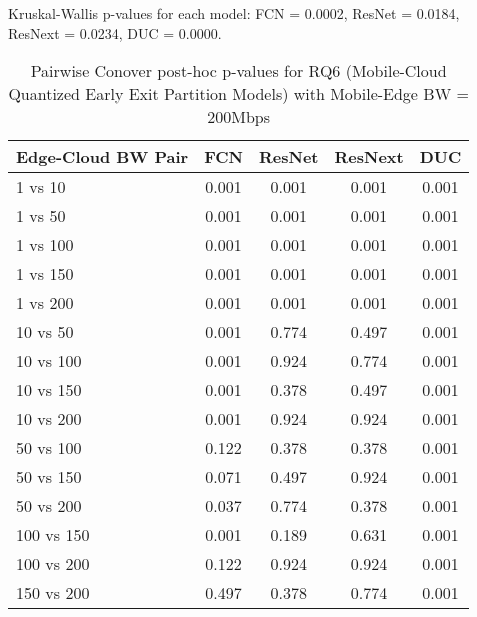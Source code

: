 \begin{table}[h]
\centering
\caption{Pairwise Conover post-hoc p-values for RQ6 (Mobile-Cloud Quantized Early Exit Partition Models) with Mobile-Edge BW = 200Mbps}
\label{tab:conover_mobile_cloud_quantized_earlyexit_partition_me200}
\smallskip
Kruskal-Wallis p-values for each model: FCN = 0.0002, ResNet = 0.0184, ResNext = 0.0234, DUC = 0.0000.

\begin{tabular}{lcccc}
\toprule
Edge-Cloud BW Pair & FCN & ResNet & ResNext & DUC \\
\midrule
1 vs 10 & 0.001 & 0.001 & 0.001 & 0.001 \\
1 vs 50 & 0.001 & 0.001 & 0.001 & 0.001 \\
1 vs 100 & 0.001 & 0.001 & 0.001 & 0.001 \\
1 vs 150 & 0.001 & 0.001 & 0.001 & 0.001 \\
1 vs 200 & 0.001 & 0.001 & 0.001 & 0.001 \\
10 vs 50 & 0.001 & 0.774 & 0.497 & 0.001 \\
10 vs 100 & 0.001 & 0.924 & 0.774 & 0.001 \\
10 vs 150 & 0.001 & 0.378 & 0.497 & 0.001 \\
10 vs 200 & 0.001 & 0.924 & 0.924 & 0.001 \\
50 vs 100 & 0.122 & 0.378 & 0.378 & 0.001 \\
50 vs 150 & 0.071 & 0.497 & 0.924 & 0.001 \\
50 vs 200 & 0.037 & 0.774 & 0.378 & 0.001 \\
100 vs 150 & 0.001 & 0.189 & 0.631 & 0.001 \\
100 vs 200 & 0.122 & 0.924 & 0.924 & 0.001 \\
150 vs 200 & 0.497 & 0.378 & 0.774 & 0.001 \\
\bottomrule
\end{tabular}
\end{table}

